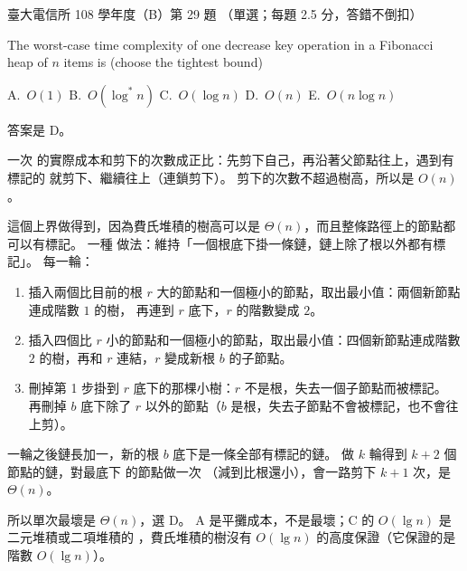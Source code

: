 \begin{pastexam}[label={px:ntu-108-comm-dsab-29}]{臺大電信所 108 學年度（B）第 29 題}
（單選；每題 2.5 分，答錯不倒扣）

The worst-case time complexity of one decrease key operation in a Fibonacci heap of $n$ items is
(choose the tightest bound)

A.~$O(1)$ \qquad B.~$O(\log^* n)$ \qquad C.~$O(\log n)$ \qquad D.~$O(n)$ \qquad E.~$O(n\log n)$
\end{pastexam}

\begin{pastsoln}
答案是 D。

一次  的實際成本和剪下的次數成正比：先剪下自己，再沿著父節點往上，遇到有標記的
就剪下、繼續往上（連鎖剪下）。 剪下的次數不超過樹高，所以是 $O(n)$。

這個上界做得到，因為費氏堆積的樹高可以是 $\Theta(n)$，而且整條路徑上的節點都可以有標記。 一種
做法：維持「一個根底下掛一條鏈，鏈上除了根以外都有標記」。 每一輪：
\begin{enumerate}
\item 插入兩個比目前的根 $r$ 大的節點和一個極小的節點，取出最小值：兩個新節點連成階數 $1$ 的樹，
再連到 $r$ 底下，$r$ 的階數變成 $2$。
\item 插入四個比 $r$ 小的節點和一個極小的節點，取出最小值：四個新節點連成階數 $2$ 的樹，再和 $r$
連結，$r$ 變成新根 $b$ 的子節點。
\item 刪掉第 1 步掛到 $r$ 底下的那棵小樹：$r$ 不是根，失去一個子節點而被標記。 再刪掉 $b$ 底下除了
$r$ 以外的節點（$b$ 是根，失去子節點不會被標記，也不會往上剪）。
\end{enumerate}
一輪之後鏈長加一，新的根 $b$ 底下是一條全部有標記的鏈。 做 $k$ 輪得到 $k + 2$ 個節點的鏈，對最底下
的節點做一次 （減到比根還小），會一路剪下 $k + 1$ 次，是 $\Theta(n)$。

所以單次最壞是 $\Theta(n)$，選 D。 A 是平攤成本，不是最壞；C 的 $O(\lg n)$ 是二元堆積或二項堆積的
，費氏堆積的樹沒有 $O(\lg n)$ 的高度保證（它保證的是階數 $O(\lg n)$）。
\end{pastsoln}
